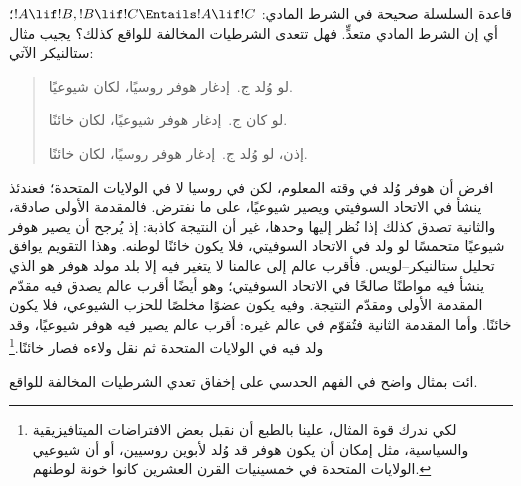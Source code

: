 \documentclass[../../../include/open-logic-section]{subfiles}
\begin{document}


قاعدة السلسلة صحيحة في الشرط المادي:
$!A \lif !B, !B \lif !C \Entails !A \lif !C$؛ أي إن الشرط المادي
متعدٍّ. فهل تتعدى الشرطيات المخالفة للواقع كذلك؟ يجيب مثال ستالنيكر
الآتي:
\begin{quote}
  لو وُلد ج.~إدغار هوفر روسيًا، لكان شيوعيًا.

  لو كان ج.~إدغار هوفر شيوعيًا، لكان خائنًا.

  إذن، لو وُلد ج.~إدغار هوفر روسيًا، لكان خائنًا.
\end{quote}
افرض أن هوفر وُلد في وقته المعلوم، لكن في روسيا لا في الولايات المتحدة؛
فعندئذ ينشأ في الاتحاد السوفيتي ويصير شيوعيًا، على ما نفترض. فالمقدمة
الأولى صادقة، والثانية تصدق كذلك إذا نُظر إليها وحدها، غير أن النتيجة
كاذبة: إذ يُرجح أن يصير هوفر شيوعيًا متحمسًا لو ولد في الاتحاد
السوفيتي، فلا يكون خائنًا لوطنه. وهذا التقويم يوافق تحليل
ستالنيكر--لويس. فأقرب عالم إلى عالمنا لا يتغير فيه إلا بلد مولد هوفر
هو الذي ينشأ فيه مواطنًا صالحًا في الاتحاد السوفيتي؛ وهو أيضًا أقرب
عالم يصدق فيه مقدّم المقدمة الأولى ومقدّم النتيجة. وفيه يكون عضوًا
مخلصًا للحزب الشيوعي، فلا يكون خائنًا. وأما المقدمة الثانية فتُقوّم في
عالم غيره: أقرب عالم يصير فيه هوفر شيوعيًا، وقد ولد فيه في الولايات
المتحدة ثم نقل ولاءه فصار خائنًا.\footnote{لكي ندرك قوة المثال، علينا بالطبع أن نقبل بعض
  الافتراضات الميتافيزيقية والسياسية، مثل إمكان أن يكون هوفر قد وُلد
  لأبوين روسيين، أو أن شيوعيي الولايات المتحدة في خمسينيات القرن
  العشرين كانوا خونة لوطنهم.}

\begin{prob}
  ائت بمثال واضح في الفهم الحدسي على إخفاق تعدي الشرطيات المخالفة للواقع.
\end{prob}
\end{document}
